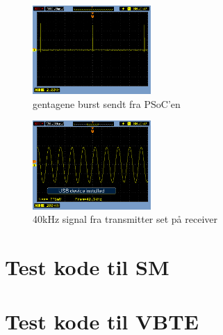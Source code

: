 \begin{figure}[hbpt]
\centering
\includegraphics[width = 0.4\textwidth]{billeder/gentageneburst}
\caption{gentagene burst sendt fra PSoC'en}
\label{fig:burstpsoc}
\end{figure}
\begin{figure}[hbpt]
\centering
\includegraphics[width = 0.4\textwidth]{billeder/transmittertest}
\caption{40kHz signal fra transmitter set på receiver}
\label{fig:transmittertest}
\end{figure}

\section{Test kode til SM}
\texttt{}
\section{Test kode til VBTE}

\texttt{}






